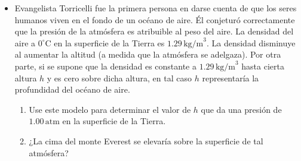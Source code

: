 \documentclass[11pt,a4paper]{article}
\begin{document}
\begin{itemize}
    \item[\textbf{37.}] Evangelista Torricelli fue la primera persona en darse cuenta de que los seres humanos viven en el fondo de un océano de aire. Él conjeturó correctamente que la presión de la atmósfera es atribuible al peso del aire. La densidad del aire a \(0^\circ\text{C}\) en la superficie de la Tierra es \(1.29\,\text{kg/m}^3\). La densidad disminuye al aumentar la altitud (a medida que la atmósfera se adelgaza). Por otra parte, si se supone que la densidad es constante a \(1.29\,\text{kg/m}^3\) hasta cierta altura \(h\) y es cero sobre dicha altura, en tal caso \(h\) representaría la profundidad del océano de aire.
    \begin{enumerate}
        \item Use este modelo para determinar el valor de \(h\) que da una presión de \(1.00\,\text{atm}\) en la superficie de la Tierra.
        \item ¿La cima del monte Everest se elevaría sobre la superficie de tal atmósfera?
    \end{enumerate}
    \vspace*{6cm}
\end{itemize}

\newpage
\end{document}

